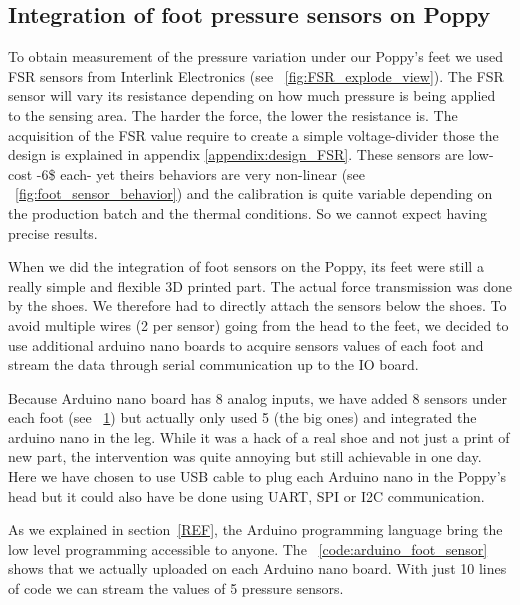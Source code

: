 \subsection{Integration of foot pressure sensors on Poppy} %

To obtain measurement of the pressure variation under our Poppy's feet we used FSR sensors from Interlink Electronics (see \figurename~\ref{fig:FSR_explode_view}). The FSR sensor will vary its resistance depending on how much pressure is being applied to the sensing area. The harder the force, the lower the resistance is. The acquisition of the FSR value require to create a simple voltage-divider those the design is explained in appendix \ref{appendix:design_FSR}. These sensors are low-cost -6\$ each- yet theirs behaviors are very non-linear (see \figurename~\ref{fig:foot_sensor_behavior}) and the calibration is quite variable depending on the production batch and the thermal conditions. So we cannot expect having precise results.

When we did the integration of foot sensors on the Poppy, its feet were still a really simple and flexible 3D printed part. The actual force transmission was done by the shoes. We therefore had to directly attach the sensors below the shoes.
To avoid multiple wires (2 per sensor) going from the head to the feet, we decided to use additional arduino nano boards to acquire sensors values of each foot and stream the data through serial communication up to the IO board.

Because Arduino nano board has 8 analog inputs, we have added 8 sensors under each foot (see \figurename~\ref{fig:poppy_foot_sensors}) but actually only used 5 (the big ones) and integrated the arduino nano in the leg. While it was a hack of a real shoe and not just a print of new part, the intervention was quite annoying but still achievable in one day. Here we have chosen to use USB cable to plug each Arduino nano in the Poppy's head but it could also have be done using UART, SPI or I2C communication.

\begin{figure}[h]
\centering
    \hfil
    \caption{}
    \label{fig:poppy_foot_sensors}
\end{figure}


As we explained in section~\ref{REF}, the Arduino programming language bring the low level programming accessible to anyone. The \codename~\ref{code:arduino_foot_sensor} shows that we actually uploaded on each Arduino nano board. With just 10 lines of code we can stream the values of 5 pressure sensors.

